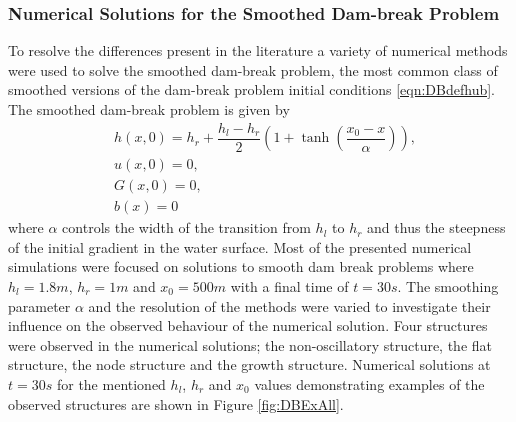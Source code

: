 \subsubsection{Numerical Solutions for the Smoothed Dam-break Problem}
To resolve the differences present in the literature a variety of numerical methods were used to solve the smoothed dam-break problem, the most common class of smoothed versions of the dam-break problem initial conditions \eqref{eqn:DBdefhub}. The smoothed dam-break problem is given by
\begin{subequations}
	\begin{align}
	&h(x,0) = h_r + \dfrac{h_l - h_r}{2} \left(1 +  \tanh\left(\dfrac{x_0 - x}{\alpha}\right) \right), \\
	&u(x,0) = 0 , \\
	&G(x,0) = 0 , \\
	&b(x) = 0
	\end{align}
	\label{eqn:SmoothDB}
\end{subequations}
where $\alpha$ controls the width of the transition from $h_l$ to $h_r$ and thus the steepness of the initial gradient in the water surface. Most of the presented numerical simulations were focused on solutions to smooth dam break problems where $h_l = 1.8m$, $h_r = 1m$ and $x_0 = 500m$ with a final time of $t=30s$. The smoothing parameter $\alpha$ and the resolution of the methods were varied to investigate their influence on the observed behaviour of the numerical solution. Four structures were observed in the numerical solutions; the non-oscillatory structure, the flat structure, the node structure and the growth structure. Numerical solutions at $t=30s$ for the mentioned $h_l$, $h_r$ and $x_0$ values demonstrating examples of the observed structures are shown in Figure \ref{fig:DBExAll}. 
